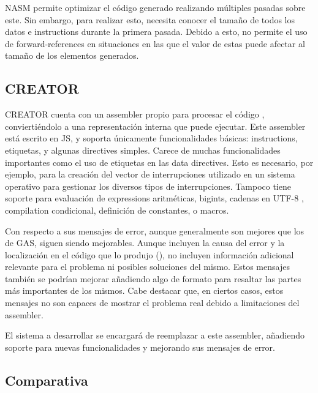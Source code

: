 NASM permite optimizar el código generado realizando múltiples pasadas sobre
este. Sin embargo, para realizar esto, necesita conocer el tamaño de todos los
datos e \glspl{instruction} durante la primera pasada. Debido a esto, no permite
el uso de \glspl{forward-reference} en situaciones en las que el valor de estas
puede afectar al tamaño de los elementos generados. \parencite{NASM-manual}

\subsection{CREATOR}

CREATOR \parencite{CREATOR} cuenta con un \gls{assembler} propio para procesar
el código , conviertiéndolo a una representación
interna que puede ejecutar. Este \gls{assembler} está escrito en \gls{JS}, y
soporta únicamente funcionalidades básicas: \glspl{instruction}, etiquetas,
y algunas \glspl{directive} simples. Carece de muchas funcionalidades importantes
como el uso de etiquetas en las \glspl{data directive}. Esto es necesario, por
ejemplo, para la creación del vector de interrupciones utilizado en un sistema
operativo para gestionar los diversos tipos de interrupciones. Tampoco tiene
soporte para evaluación de \glspl{expression} aritméticas, \glspl{bigint},
cadenas en UTF-8 \parencite{UTF-8}, \gls{compilation} condicional, definición de
constantes, o \glspl{macro}.

Con respecto a sus mensajes de error, aunque generalmente son mejores que los de
\gls{GAS}, siguen siendo mejorables. Aunque incluyen la causa del error y la
localización en el código que lo produjo (), no
incluyen información adicional relevante para el problema ni posibles soluciones
del mismo. Estos mensajes también se podrían mejorar añadiendo algo de formato
para resaltar las partes más importantes de los mismos. Cabe destacar que, en
ciertos casos, estos mensajes no son capaces de mostrar el problema real debido
a limitaciones del \gls{assembler}.


El sistema a desarrollar se encargará de reemplazar a este \gls{assembler},
añadiendo soporte para nuevas funcionalidades y mejorando sus mensajes de error.

\subsection{Comparativa}

